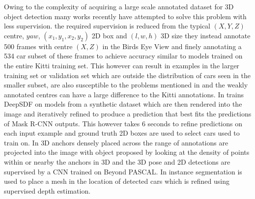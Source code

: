 Owing to the complexity of acquiring a large scale annotated dataset for 3D object detection many works recently have attempted to solve this problem with less supervision. \cite{meng2020ws3d} the required supervision is reduced from the typical $(X,Y,Z)$ centre, $yaw$, $(x_1,y_1,x_2,y_2)$ 2D box and $(l,w,h)$ 3D size they instead annotate 500 frames with centre $(X,Z)$ in the Birds Eye View and finely annotating a 534 car subset of these frames to achieve accuracy similar to models trained on the entire Kitti training set. This however can result in examples in the larger training set or validation set which are outside the distribution of cars seen in the smaller subset, are also susceptible to the problems mentioned in \cite{feng2020labels} and the weakly annotated centres can have a large difference to the Kitti annotations. In \cite{sdflabel} trains DeepSDF\cite{Park_2019_CVPR} on models from a synthetic dataset which are then rendered into the image and iteratively refined to produce a prediction that best fits the predictions of Mask R-CNN outputs.
This however takes 6 seconds to refine predictions on each input example and ground truth 2D boxes are used to select cars used to train on. In \cite{qin20weakly} 3D anchors densely placed across the range of annotations are projected into the image with object proposed by looking at the density of points within or nearby the anchors in 3D and the 3D pose and 2D detections are supervised by a CNN trained on Beyond PASCAL\cite{xiang14beyond}. In \cite{koestler2020learning} instance segmentation is used to place a mesh in the location of detected cars which is refined using supervised depth estimation. 

